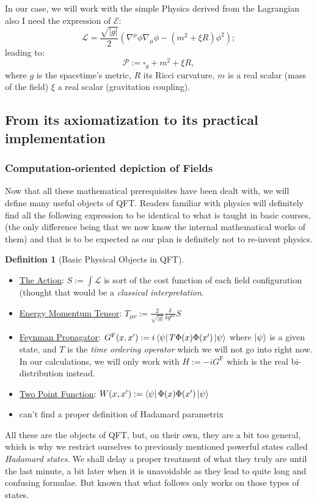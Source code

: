 \documentclass[a4paper,11pt]{article}
\numberwithin{equation}{section}
\theoremstyle{definition}
\newtheorem{definition}{Definition}
\begin{document}
        In our case, we will work with the simple Physics derived from the Lagrangian \color{red} also I need the expression of $\mathcal{E}$\color{black}:
        $$\mathcal{L}=\frac{\sqrt{|g|}}{2}\left(\nabla^\mu\phi\nabla_\mu\phi- (m^2+\xi R)\phi^2\right);$$
        leading to:
        $$\mathcal{P}:=\square_g + m^2 + \xi R,$$
        where $g$ is the spacetime's metric, $R$ its Ricci curvature, $m$ is a real scalar (mass of the field) $\xi$ a real scalar (gravitation coupling).

        
\subsection{From its axiomatization to its practical implementation}
\subsubsection{Computation-oriented depiction of Fields}
        Now that all these mathematical prerequisites have been dealt with, we will define many useful objects of QFT. Readers familiar with physics will definitely find all the following expression to be identical to what is taught in basic courses, (the only difference being that we now know the internal mathematical works of them) and that is to be expected as our plan is definitely not to re-invent physics.

        \begin{definition}[Basic Physical Objects in QFT]$\quad$
        \begin{itemize}
            \item \underline{The Action}: $S:= \int \mathcal{L}$ is sort of the cost function of each field configuration (thought that would be a \emph{classical interpretation}.
            \item \underline{Energy Momentum Tensor}: $T_{\mu\nu}:=\frac{2}{\sqrt{|g|}}\frac{\delta}{\delta g^{\mu\nu}}S$
            \item \underline{Feynman Propagator}: $G^\mathrm{F}(x,x'):=i\bra{\psi}T\Phi(x)\Phi(x')\ket{\psi}$ where $\ket{\psi}$ is a given state, and $T$ is the \emph{time ordering operator} which we will not go into right now. In our calculations, we will only work with $H:=-iG^\mathrm{F}$ which is the real bi-distribution instead.
            \item \underline{Two Point Function}: $W(x,x'):=\bra{\psi}\Phi(x)\Phi(x')\ket{\psi}$
            \item \color{red} can't find a proper definition of Hadamard parametrix\color{black}
        \end{itemize}
        \end{definition}
        All these are the objects of QFT, but, on their own, they are a bit too general, which is why we restrict ourselves to previously mentioned powerful states called \emph{Hadamard states}. We shall delay a proper treatment of what they truly are until the last minute, a bit later when it is unavoidable as they lead to quite long and confusing formulae. But known that what follows only works on those types of states.
\end{document}
